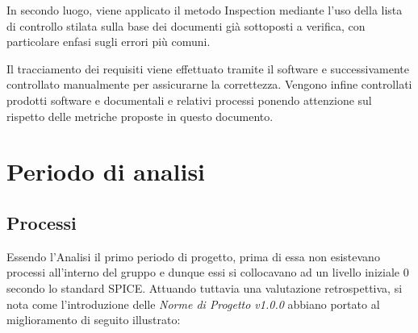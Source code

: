 \documentclass[openany,12pt,a4paper]{report}
\begin{document}
\noindent In secondo luogo, viene applicato il metodo Inspection mediante l'uso della lista di controllo stilata sulla base dei documenti già sottoposti a verifica, con particolare enfasi sugli errori più comuni.

\noindent Il tracciamento dei requisiti viene effettuato tramite il software  e successivamente controllato manualmente per assicurarne la correttezza.
Vengono infine controllati prodotti software e documentali e relativi processi ponendo attenzione sul rispetto delle metriche proposte in questo documento.

\section{Periodo di analisi}

\subsection{Processi}

Essendo l'Analisi il primo periodo di progetto, prima di essa non esistevano processi all'interno del gruppo e dunque essi si collocavano ad un livello iniziale 0 secondo lo standard SPICE. Attuando tuttavia una valutazione retrospettiva, si nota come l'introduzione delle \textit{Norme di Progetto v1.0.0} abbiano portato al miglioramento di seguito illustrato:
\end{document}
